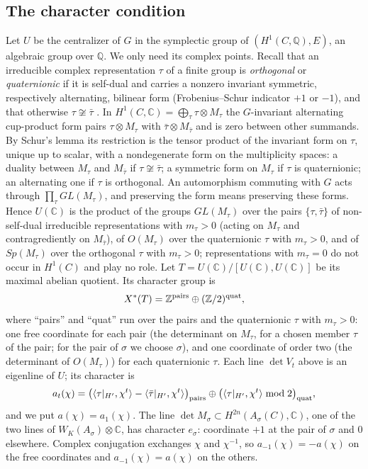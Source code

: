 \documentclass[11pt]{amsart}
\theoremstyle{definition}
\theoremstyle{remark}
\newcommand{\Q}{\mathbb Q}
\newcommand{\Z}{\mathbb Z}
\newcommand{\C}{\mathbb C}
\begin{document}
\subsection{The character condition}
Let $U$ be the centralizer of $G$ in the symplectic group of $(H^1(C,\Q),E)$, an algebraic group over $\Q$. We only need its complex points. Recall that an irreducible complex representation $\tau$ of a finite group is \emph{orthogonal} or \emph{quaternionic} if it is self-dual and carries a nonzero invariant symmetric, respectively alternating, bilinear form (Frobenius--Schur indicator $+1$ or $-1$), and that otherwise $\tau\not\cong\bar\tau$ \cite[\S13.2]{SerreLin}. In $H^1(C,\C)=\bigoplus_\tau\tau\otimes M_\tau$ the $G$-invariant alternating cup-product form pairs $\tau\otimes M_\tau$ with $\bar\tau\otimes M_{\bar\tau}$ and is zero between other summands. By Schur's lemma its restriction is the tensor product of the invariant form on $\tau$, unique up to scalar, with a nondegenerate form on the multiplicity spaces: a duality between $M_\tau$ and $M_{\bar\tau}$ if $\tau\not\cong\bar\tau$; a symmetric form on $M_\tau$ if $\tau$ is quaternionic; an alternating one if $\tau$ is orthogonal. An automorphism commuting with $G$ acts through $\prod_\tau GL(M_\tau)$, and preserving the form means preserving these forms. Hence $U(\C)$ is the product of the groups $GL(M_\tau)$ over the pairs $\{\tau,\bar\tau\}$ of non-self-dual irreducible representations with $m_\tau>0$ (acting on $M_\tau$ and contragrediently on $M_{\bar\tau}$), of $O(M_\tau)$ over the quaternionic $\tau$ with $m_\tau>0$, and of $Sp(M_\tau)$ over the orthogonal $\tau$ with $m_\tau>0$; representations with $m_\tau=0$ do not occur in $H^1(C)$ and play no role. Let $T=U(\C)/[U(\C),U(\C)]$ be its maximal abelian quotient. Its character group is
\[
X^*(T)=\Z^{\rm pairs}\oplus(\Z/2)^{\rm quat},
\]
where ``pairs'' and ``quat'' run over the pairs and the quaternionic $\tau$ with $m_\tau>0$: one free coordinate for each pair (the determinant on $M_\tau$, for a chosen member $\tau$ of the pair; for the pair of $\sigma$ we choose $\sigma$), and one coordinate of order two (the determinant of $O(M_\tau)$) for each quaternionic $\tau$. Each line $\det V_t$ above is an eigenline of $U$; its character is
\[
a_t(\chi)=\big(\langle\tau|_{H'},\chi^t\rangle-\langle\bar\tau|_{H'},\chi^t\rangle\big)_{\rm pairs}\oplus\big(\langle\tau|_{H'},\chi^t\rangle\bmod2\big)_{\rm quat},
\]
and we put $a(\chi)=a_1(\chi)$. The line $\det M_\sigma\subset H^{2n}(A_\sigma(C),\C)$, one of the two lines of $W_K(A_\sigma)\otimes\C$, has character $e_\sigma$: coordinate $+1$ at the pair of $\sigma$ and $0$ elsewhere. Complex conjugation exchanges $\chi$ and $\chi^{-1}$, so $a_{-1}(\chi)=-a(\chi)$ on the free coordinates and $a_{-1}(\chi)=a(\chi)$ on the others.
\end{document}
